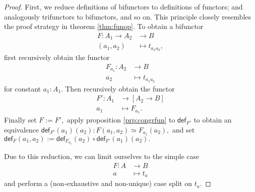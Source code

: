 \documentclass[a4paper]{article}
\theoremstyle{definition}
\theoremstyle{remark}
\renewcommand{\equiv}{\simeq}
\newcommand{\nm}{\mathsf}
\newcommand{\fndef}[1]{\nm{def}_{#1}}
\begin{document}
\begin{proof}
  First, we reduce definitions of bifunctors to definitions of functors; and analogously
  trifunctors to bifunctors, and so on. This principle closely resembles the proof
  strategy in theorem \ref{thm:funop}. To obtain a bifunctor
  \begin{align*}
    F : A_1 \to A_2 &\to     B\\
        (a_1,a_2)   &\mapsto t_{a_1a_2},
  \end{align*}
  first recursively obtain the functor
  \begin{align*}
    F_{a_1} : A_2 &\to     B\\
              a_2 &\mapsto t_{a_1a_2}
  \end{align*}
  for constant $a_1 : A_1.$
  Then recursively obtain the functor
  \begin{align*}
    F' : A_1 &\to     [A_2 \to B]\\
         a_1 &\mapsto F_{a_1}.
  \end{align*}
  Finally set $F := F',$ apply proposition \ref{prp:congrfun} to $\fndef{F'}$ to obtain
  an equivalence $\fndef{F'}(a_1)(a_2) : F(a_1,a_2) \equiv F_{a_1}(a_2),$ and set
  $\fndef{F}(a_1,a_2) := \fndef{F_{a_1}}(a_2) \circ \fndef{F'}(a_1)(a_2).$

  Due to this reduction, we can limit ourselves to the simple case
  \begin{align*}
    F : A &\to     B\\
        a &\mapsto t_a
  \end{align*}
  and perform a (non-exhaustive and non-unique) case split on $t_a.$


\end{proof}
\end{document}
